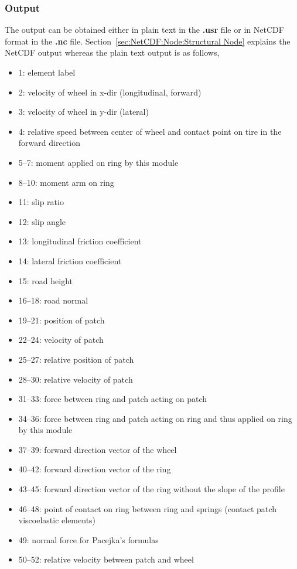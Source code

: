 \subsubsection{Output}
The output can be obtained either in plain text in the \textbf{.usr} file or in NetCDF format in the \textbf{.nc} file. Section~\ref{sec:NetCDF:Node:Structural Node} explains the NetCDF output whereas the plain text output is as follows,
\begin{itemize}
\item 1: element label
\item 2: velocity of wheel in x-dir (longitudinal, forward)
\item 3: velocity of wheel in y-dir (lateral)
\item 4: relative speed between center of wheel and contact point on tire in the forward direction
\item 5--7: moment applied on ring by this module
\item 8--10: moment arm on ring
\item 11: slip ratio
\item 12: slip angle
\item 13: longitudinal friction coefficient
\item 14: lateral friction coefficient
\item 15: road height
\item 16--18: road normal
\item 19--21: position of patch
\item 22--24: velocity of patch
\item 25--27: relative position of patch
\item 28--30: relative velocity of patch
\item 31--33: force between ring and patch acting on patch
\item 34--36: force between ring and patch acting on ring and thus applied on ring by this module
\item 37--39: forward direction vector of the wheel
\item 40--42: forward direction vector of the ring
\item 43--45: forward direction vector of the ring without the slope of the profile
\item 46--48: point of contact on ring between ring and springs (contact patch viscoelastic elements)
\item 49: normal force for Pacejka's formulas
\item 50--52: relative velocity between patch and wheel

\end{itemize}
